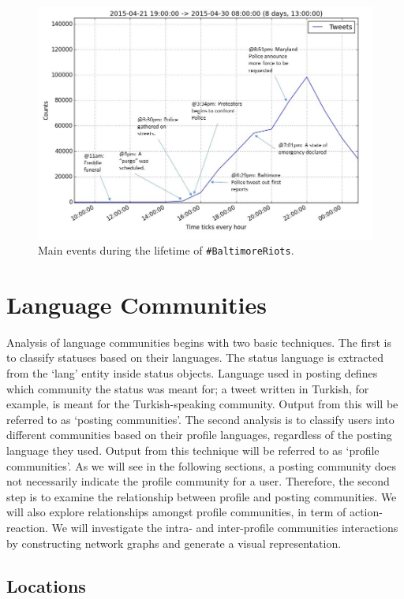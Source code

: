 \documentclass[conference]{IEEEtran}
\begin{document}
\begin{figure}[!htb]
\centering
\includegraphics[width=\columnwidth]{images/mainevents.png}
\caption{Main events during the lifetime of {\texttt{\#BaltimoreRiots}}.}
\label{fig:mainevents}
\end{figure}


\section{Language Communities}\label{langcomm}

Analysis of language communities begins with two basic techniques. The
first is to classify statuses based on their languages. The status
language is extracted from the `lang' entity inside status
objects. Language used in posting defines which community the status
was meant for; a tweet written in Turkish, for example, is meant for
the Turkish-speaking community. Output from this will be referred to
as `posting communities'. The second analysis is to classify users
into different communities based on their profile languages,
regardless of the posting language they used. Output from this
technique will be referred to as `profile communities'. As we will see
in the following sections, a posting community does not necessarily
indicate the profile community for a user. Therefore, the second step
is to examine the relationship between profile and posting
communities. We will also explore relationships amongst profile
communities, in term of action-reaction. We will investigate the
intra- and inter-profile communities interactions by constructing
network graphs and generate a visual representation.

\subsection{Locations}\label{locations}
\end{document}
